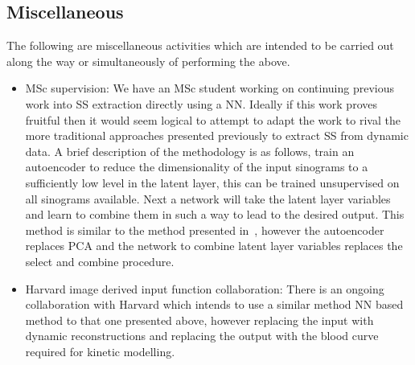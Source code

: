         \subsection{Miscellaneous} \label{sec:future_work_miscellaneous}
            The following are miscellaneous activities which are intended to be carried out along the way or simultaneously of performing the above.
            \begin{itemize}
                \item \gls{MSc} supervision: We have an \gls{MSc} student working on continuing previous work into \gls{SS} extraction directly using a \gls{NN}. Ideally if this work proves fruitful then it would seem logical to attempt to adapt the work to rival the more traditional approaches presented previously to extract \gls{SS} from dynamic data. A brief description of the methodology is as follows, train an autoencoder to reduce the dimensionality of the input sinograms to a sufficiently low level in the latent layer, this can be trained unsupervised on all sinograms available. Next a network will take the latent layer variables and learn to combine them in such a way to lead to the desired output. This method is similar to the method presented in~, however the autoencoder replaces \gls{PCA} and the network to combine latent layer variables replaces the select and combine procedure.
    
                \item Harvard image derived input function collaboration: There is an ongoing collaboration with Harvard which intends to use a similar method \gls{NN} based method to that one presented above, however replacing the input with dynamic reconstructions and replacing the output with the blood curve required for kinetic modelling.
            \end{itemize}

